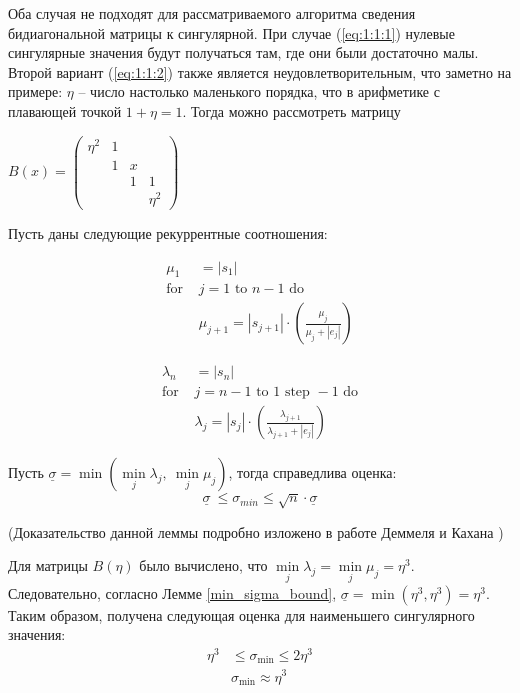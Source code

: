 Оба случая не подходят для рассматриваемого алгоритма сведения бидиагональной матрицы к сингулярной. При случае (\ref{eq:1:1:1}) нулевые сингулярные значения будут получаться там, где они были достаточно малы. Второй вариант (\ref{eq:1:1:2})  также является неудовлетворительным, что заметно на примере: $\eta$ -- число настолько маленького порядка, что в арифметике с плавающей точкой $1+\eta=1$. Тогда можно рассмотреть матрицу
\begin{center}
$B(x)=\begin{pmatrix}
    \eta^2&1&&\\
    &1&x\\
    &&1&1\\
    &&&\eta^2
\end{pmatrix}$
\end{center}

\begin{lemma} \label{min_sigma_bound}
Пусть даны следующие рекуррентные соотношения: \\
\begin{minipage}{0.48\textwidth}
\begin{align*}
\mu_1& = |s_1| \\
\text{for }& j = 1 \text{ to } n-1 \text{ do} \\
&\mu_{j+1} = |s_{j+1}| \cdot \left( \frac{\mu_j}{\mu_j + |e_j|} \right)
\end{align*}
\end{minipage}
\hfill
\begin{minipage}{0.48\textwidth}
\begin{align*}
\lambda_n& = |s_n| \\
\text{for }& j = n-1 \text{ to } 1 \text{ step } -1 \text{ do} \\
&\lambda_j = |s_j| \cdot \left( \frac{\lambda_{j+1}}{\lambda_{j+1} + |e_j|} \right)
\end{align*}
\end{minipage}
\vspace{1em}

Пусть $\underline{\sigma} = \min(\min\limits_j \lambda_j, \ \min\limits_j \mu_j)$, тогда справедлива оценка:
\begin{equation}
\underline{\sigma}\ \leq \sigma_{min}\leq \sqrt{n}\cdot\underline{\sigma}
\end{equation}
\end{lemma}
(Доказательство данной леммы подробно изложено в работе Деммеля и Кахана \cite[стр. 5-6]{Demmel1990})


Для матрицы $B(\eta)$ было вычислено, что $\min\limits_j \lambda_j = \min\limits_j \mu_j = \eta^3$. Следовательно, согласно Лемме \ref{min_sigma_bound}, $\underline{\sigma} = \min(\eta^3, \eta^3) = \eta^3$. Таким образом, получена следующая оценка для наименьшего сингулярного значения:
\begin{align*}
\eta^3 &\leq \sigma_{\min} \leq 2\eta^3 \\
&\sigma_{\min} \approx \eta^3
\end{align*}

